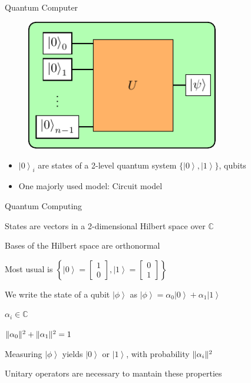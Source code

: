 \documentclass[professionalfonts]{beamer}
\newcommand{\ket}[1]{\ensuremath{\left|#1\right\rangle}}
\DeclarePairedDelimiter\norm{\lVert}{\rVert}
\newcommand{\SubItem}[1]{
    {\setlength\itemindent{15pt} \item[*] #1}
}
\begin{document}
\begin{frame}{Quantum Computer}
\begin{figure}[b]
	\centering
	\includegraphics[width=0.75\textwidth]{img/quantum}
\end{figure}
	\begin{itemize}
		\item $\ket 0_i$ are states of a 2-level quantum system $\{\ket 0, \ket 1\}$, qubits
		\item One majorly used model: Circuit model
	\end{itemize}
\end{frame}



\begin{frame}{Quantum Computing}
	\begin{itemize}
		\item States are vectors in a 2-dimensional Hilbert space over $\mathbb{C}$
		\item Bases of the Hilbert space are orthonormal
			\SubItem {Most usual is 
				$\left\{
					\ket 0 = \begin{bmatrix} 1 \\ 0 \end{bmatrix},
					\ket 1 = \begin{bmatrix} 0 \\ 1 \end{bmatrix}
				\right\}$}
		\item We write the state of a qubit $\ket \phi$ as $\ket \phi = \alpha_0 \ket 0 + \alpha_1 \ket 1$
			\SubItem {$\alpha_i \in \mathbb{C}$}
			\SubItem {$\norm {\alpha_0}^2 + \norm{\alpha_1}^2 = 1 $}
			\SubItem {Measuring $\ket \phi$ yields $\ket 0$ or $\ket 1$, with probability $\norm{\alpha_i}^2$}
			\SubItem {Unitary operators are necessary to mantain these properties}
	\end{itemize}
\end{frame}
\end{document}

